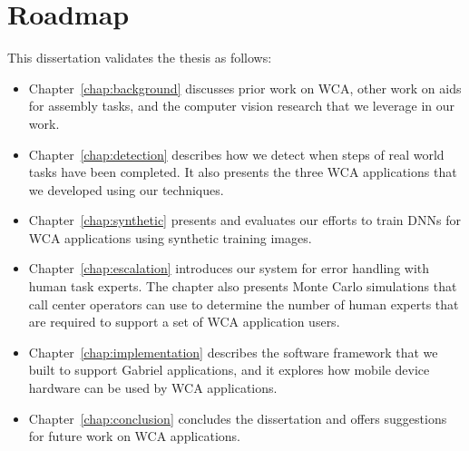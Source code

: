 \section{Roadmap}

This dissertation validates the thesis as follows:
\begin{itemize}
\item Chapter~\ref{chap:background} discusses prior work on WCA, other work on
  aids for assembly tasks, and the computer vision research that we leverage in
  our work.
\item Chapter~\ref{chap:detection} describes how we detect when steps of real
  world tasks have been completed.
  It also presents the three WCA applications that we developed using our
  techniques.
\item Chapter~\ref{chap:synthetic} presents and evaluates our efforts to train
  DNNs for WCA applications using synthetic training images.
\item Chapter~\ref{chap:escalation} introduces our system for error handling
  with human task experts.
  The chapter also presents Monte Carlo simulations that call center operators
  can use to determine the number of human experts that are required to support
  a set of WCA application users.
\item Chapter~\ref{chap:implementation} describes the software framework that
  we built to support Gabriel applications, and it explores how mobile device
  hardware can be used by WCA applications.
\item Chapter~\ref{chap:conclusion} concludes the dissertation and offers
  suggestions for future work on WCA applications.
\end{itemize}

